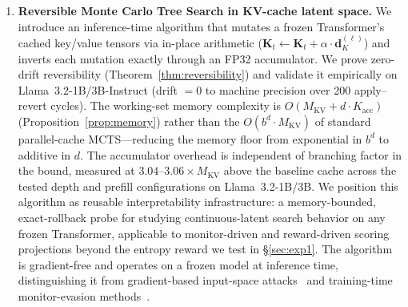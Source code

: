 \documentclass{article}
\begin{document}
\begin{enumerate}[leftmargin=*]
    \item \textbf{Reversible Monte Carlo Tree Search in KV-cache latent space.} We introduce an inference-time algorithm that mutates a frozen Transformer's cached key/value tensors via in-place arithmetic ($\mathbf{K}_t \leftarrow \mathbf{K}_t + \alpha \cdot \mathbf{d}_K^{(\ell)}$) and inverts each mutation exactly through an FP32 accumulator. We prove zero-drift reversibility (Theorem~\ref{thm:reversibility}) and validate it empirically on Llama~3.2-1B/3B-Instruct (drift $= 0$ to machine precision over 200 apply--revert cycles). The working-set memory complexity is $O(M_{\text{KV}} + d \cdot K_{\text{acc}})$ (Proposition~\ref{prop:memory}) rather than the $O(b^d \cdot M_{\text{KV}})$ of standard parallel-cache MCTS---reducing the memory floor from exponential in $b^d$ to additive in $d$. The accumulator overhead is independent of branching factor in the bound, measured at $3.04$--$3.06\times M_{\text{KV}}$ above the baseline cache across the tested depth and prefill configurations on Llama~3.2-1B/3B. We position this algorithm as reusable interpretability infrastructure: a memory-bounded, exact-rollback probe for studying continuous-latent search behavior on any frozen Transformer, applicable to monitor-driven and reward-driven scoring projections beyond the entropy reward we test in §\ref{sec:exp1}. The algorithm is gradient-free and operates on a frozen model at inference time, distinguishing it from gradient-based input-space attacks~\cite{zou2023gcg, bailey2024obfuscated} and training-time monitor-evasion methods~\cite{gupta2025rlobfuscation}.


\end{enumerate}
\end{document}
